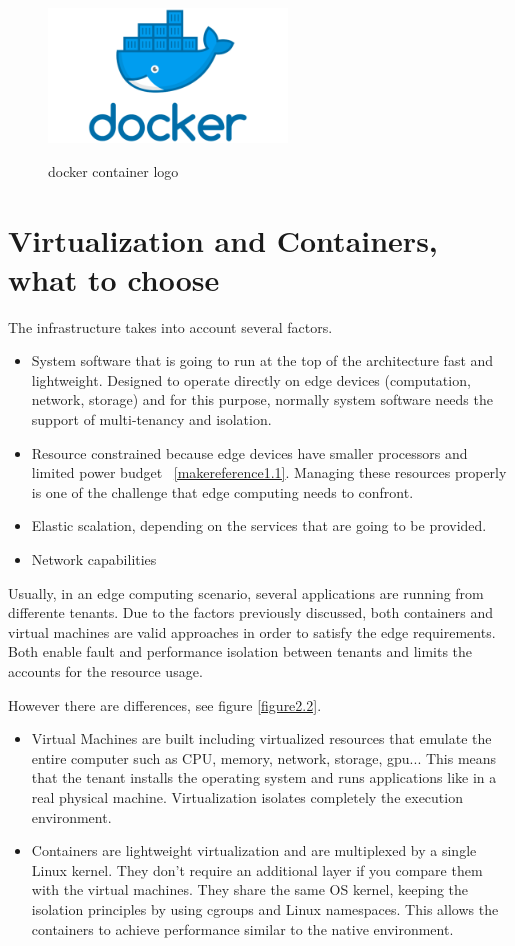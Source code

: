 \begin{figure}[h!]%
    \centering
    \includegraphics[width=2.5in]{figures/docker.png}
~\caption{docker container logo}
\label{figure2.1}
\end{figure}

\section{Virtualization and Containers, what to choose}
\label{makereference2.2}

The infrastructure takes into account several factors.

\begin{itemize}
    \item System software that is going to run at the top of the architecture fast and lightweight. Designed to operate directly on edge devices (computation, network, storage) and for this purpose, normally system software needs the support of multi-tenancy and isolation.
    \item Resource constrained because edge devices have smaller processors and limited power budget ~\ref{makereference1.1}. Managing these resources properly is one of the challenge that edge computing needs to confront.
    \item Elastic scalation, depending on the services that are going to be provided.
    \item Network capabilities
\end{itemize}
Usually, in an edge computing scenario, several applications are running from differente tenants. Due to the factors previously discussed, both containers and virtual machines are valid approaches in order to satisfy the edge requirements.~\cite{CORR:chong:2018} Both enable fault and performance isolation between tenants and limits the accounts for the resource usage.
\newpage

However there are differences, see figure \ref{figure2.2}.

\begin{itemize}
  \item Virtual Machines are built including virtualized resources that emulate the entire computer such as  CPU, memory, network, storage, gpu... This means that the tenant installs the operating system and runs applications like in a real physical machine. Virtualization isolates completely the execution environment.
  \item Containers are lightweight virtualization and are multiplexed by a single Linux kernel. They don't require an additional layer if you compare them with the virtual machines. They share the same OS kernel, keeping the isolation principles by using cgroups and Linux namespaces. This allows the containers to achieve performance similar to the native environment.
\end{itemize}


